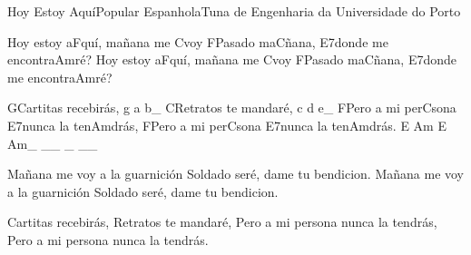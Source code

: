 \begin{musica}{Hoy Estoy Aquí}{Popular Espanhola}{Tuna de Engenharia da Universidade do Porto}

Hoy estoy a\ac{F}{quí}, mañana me \ac{C}{voy}
\ac{F}{Pa}sado ma\ac{C}{ña}na, \ac{E7}{don}de me encontra\ac{Am}{ré}?
Hoy estoy a\ac{F}{quí}, mañana me \ac{C}{voy}
\ac{F}{Pa}sado ma\ac{C}{ña}na, \ac{E7}{don}de me encontra\ac{Am}{ré}?

\ac{G}{Car}titas recebirás, \ac{g a b}{}_
\ac{C}{Re}tratos te mandaré, \ac{c d e}{}_
\ac{F}{Pe}ro a mi per\ac{C}{so}na \ac{E7}{nun}ca la ten\ac{Am}{drás},
\ac{F}{Pe}ro a mi per\ac{C}{so}na \ac{E7}{nun}ca la ten\ac{Am}{drás}. \ac{E Am E Am}{}_ __ _ __


Mañana me voy a la guarnición
Soldado seré, dame tu bendicion.
Mañana me voy a la guarnición
Soldado seré, dame tu bendicion.

Cartitas recebirás,
Retratos te mandaré,
Pero a mi persona nunca la tendrás,
Pero a mi persona nunca la tendrás.

\end{musica}
